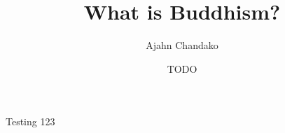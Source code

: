 \documentclass[
  11pt,
  pagePreset=widepocket,
  textType=prose,
  babelLanguage=USenglish,
]{hark}
\title{What is Buddhism?}
\subtitle{}
\author{Ajahn Chandako}
\date{TODO}
\begin{document}
\mainmatter

Testing 123
\end{document}
